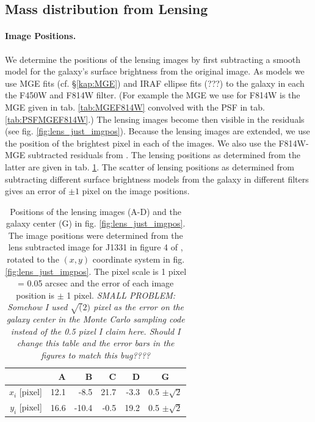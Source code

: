 \subsection{Mass distribution from Lensing} \label{sec:results_lensing}

\paragraph{Image Positions.} We determine the positions of the lensing images by first subtracting a smooth model for the galaxy's surface brightness from the original image. As models we use MGE fits (cf. \S\ref{kap:MGE}) and IRAF ellipse fits (???) to the galaxy in each the F450W and F814W filter. (For example the MGE we use for F814W is the MGE given in tab. \ref{tab:MGEF814W} convolved with the PSF in tab. \ref{tab:PSFMGEF814W}.) The lensing images become then visible in the residuals (see fig. \ref{fig:lens_just_imgpos}). Because the lensing images are extended, we use the position of the brightest pixel in each of the images. We also use the F814W-MGE subtracted residuals from \citet{SWELLSIII}. The lensing positions as determined from the latter are given in tab. \ref{tab:lenspos}. The scatter of lensing positions as determined from subtracting different surface brightness models from the galaxy in different filters gives an error of $\pm 1$ pixel on the image positions.

\begin{table}
\centering
\begin{minipage}{70mm}
\begin{tabular}{r|rrrr|c}
\hline
  & A & B & C & D & G\\\hline
$x_i$ [pixel] & 12.1 & -8.5 & 21.7 & -3.3 & 0.5 $\pm \sqrt{2}$ \\
$y_i$ [pixel] & 16.6 & -10.4 & -0.5 & 19.2 & 0.5 $\pm \sqrt{2}$ \\
\hline
\end{tabular}
\caption{Positions of the lensing images (A-D) and the galaxy center (G) in fig. \ref{fig:lens_just_imgpos}. The image positions were determined from the lens subtracted image for J1331 in figure 4 of \citet{SWELLSIII}, rotated to the $(x,y)$ coordinate system in fig. \ref{fig:lens_just_imgpos}. The pixel scale is 1 pixel = 0.05 arcsec and the error of each image position is $\pm$ 1 pixel. \textit{SMALL PROBLEM: Somehow I used $\sqrt(2)$ pixel as the error on the galaxy center in the Monte Carlo sampling code instead of the 0.5 pixel I claim here. Should I change this table and the error bars in the figures to match this bug????}}
\label{tab:lenspos}
\end{minipage}
\end{table}


